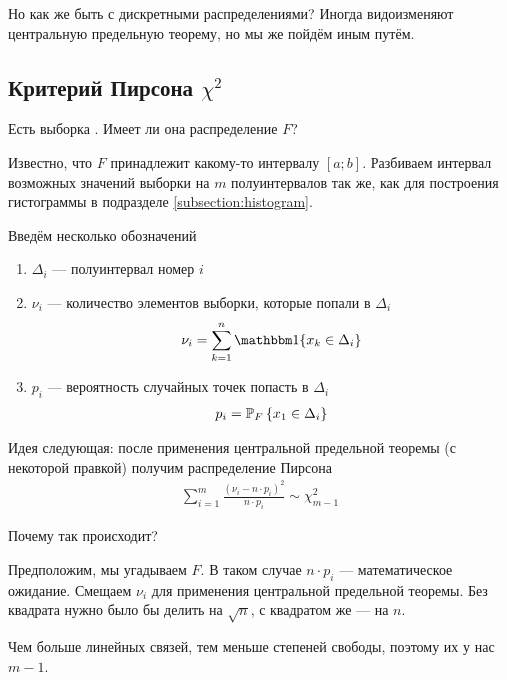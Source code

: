 Но как же быть с дискретными распределениями? Иногда видоизменяют центральную
предельную теорему, но мы же пойдём иным путём.

\subsection{Критерий Пирсона $\chi^2$}

Есть выборка \xsample. Имеет ли она распределение $F$?

Известно, что $F$ принадлежит какому-то интервалу $\left[ a; b \right]$.
Разбиваем интервал возможных значений выборки на $m$ полуинтервалов
так же, как для построения гистограммы в подразделе \ref{subsection:histogram}.

Введём несколько обозначений
\begin{enumerate}
  \item $\Delta_i$ --- полуинтервал номер $i$
  \item $\nu_i$ --- количество элементов выборки, которые попали в $\Delta_i$
      \begin{align*}
      \nu_i = \sum_{k=1}^{n} \Indicator{x_k \in \Delta_i}
      \end{align*}
  \item $p_i$ --- вероятность случайных точек попасть в $\Delta_i$
      \begin{align*}
      p_i = \Probability[F]{x_1 \in \Delta_i}
      \end{align*}
\end{enumerate}

Идея следующая: после применения центральной предельной теоремы (с некоторой
правкой) получим распределение Пирсона
\begin{align*}
  \sum_{i=1}^{m}\frac{\left( \nu_i - n \cdot p_i \right)^2}{n \cdot p_i}
  \sim \chi_{m-1}^2
\end{align*}

Почему так происходит?

Предположим, мы угадываем $F$. В таком случае $n \cdot p_i$ --- математическое
ожидание. Смещаем $\nu_i$ для применения центральной предельной теоремы.
Без квадрата нужно было бы делить на $\sqrt{n}$, с квадратом же --- на $n$.

Чем больше линейных связей, тем меньше степеней свободы, поэтому их у нас $m-1$.

